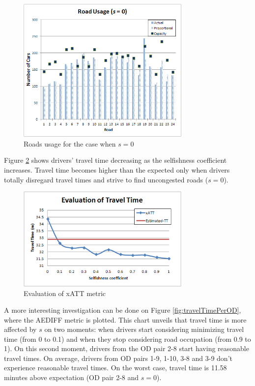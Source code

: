 \documentclass[12pt]{article}
\begin{document}
\begin{figure}[ht]
    \centerline{\includegraphics[width=8.5cm]{img/roadsUsage_s0.png}}
    \caption{Roads usage for the case when $s=0$}
    \label{fig:roadsusage_s0}
\end{figure}

Figure \ref{fig:globalTravelTime} shows drivers' travel time decreasing as the selfishness coefficient increases. Travel time becomes higher than the expected only when drivers totally  disregard travel times and strive to find uncongested roads ($s=0$).

\begin{figure}[ht]
    \centerline{\includegraphics[width=8.5cm]{img/globalTravelTime.png}}
    \caption{Evaluation of xATT metric}
    \label{fig:globalTravelTime}
\end{figure}

A more interesting investigation can be done on Figure \ref{fig:travelTimePerOD}, where the AEDIFF metric is plotted. This chart unveils that travel time is more affected by $s$ on two moments: when drivers start considering minimizing travel time (from 0 to 0.1) and when they stop considering road occupation (from 0.9 to 1). On this second moment, drivers from the OD pair 2-8 start having reasonable travel times. On average, drivers from OD pairs 1-9, 1-10, 3-8 and 3-9 don't experience reasonable travel times. On the worst case, travel time is 11.58 minutes above expectation (OD pair 2-8 and $s=0$).
\end{document}
